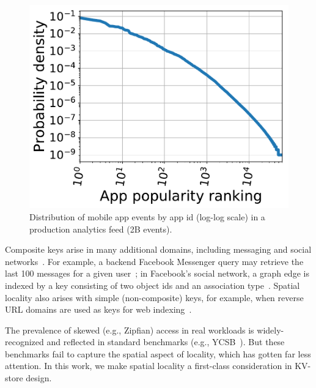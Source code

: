 

\begin{figure}[tb]
\centering
\includegraphics[width=0.6\columnwidth]{figs/app_names_loglog_line.pdf}
\caption{{Distribution of mobile app events by app id (log-log scale) in a production analytics feed (2B events).}}
\label{fig:cdf}
\end{figure}

Composite keys arise in many additional domains, including messaging and social networks~\cite{facebook-workloads}. 
For example, a backend Facebook Messenger query may retrieve the last 100 messages for a 
given user~\cite{Borthakur:2011:AHG:1989323.1989438}; %
in Facebook's social network, a graph edge is indexed by a key consisting of two 
object ids and an association type~\cite{Armstrong:2013:LDB:2463676.2465296}.
Spatial locality   also arises with simple (non-composite) keys, for example, when 
reverse  URL domains are used as keys for web  indexing~\cite{Cho:1998:ECT:297805.297835}. 

The prevalence of skewed (e.g., Zipfian)  access  in real workloads is widely-recognized 
and reflected in standard benchmarks (e.g., YCSB~\cite{YCSB}). %
But these benchmarks fail to capture the spatial aspect of locality, which has gotten far less attention.
In this work, we make spatial locality a first-class consideration in KV-store design.



